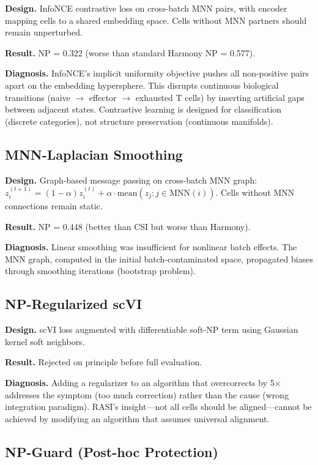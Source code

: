 \documentclass[10pt]{article}
\begin{document}
\textbf{Design.} InfoNCE contrastive loss on cross-batch MNN pairs, with encoder mapping cells to a shared embedding space. Cells without MNN partners should remain unperturbed.

\textbf{Result.} NP = 0.322 (worse than standard Harmony NP = 0.577).

\textbf{Diagnosis.} InfoNCE's implicit uniformity objective pushes all non-positive pairs apart on the embedding hypersphere. This disrupts continuous biological transitions (naive $\to$ effector $\to$ exhausted T cells) by inserting artificial gaps between adjacent states. Contrastive learning is designed for classification (discrete categories), not structure preservation (continuous manifolds).

\subsection{MNN-Laplacian Smoothing}

\textbf{Design.} Graph-based message passing on cross-batch MNN graph: $z_i^{(t+1)} = (1-\alpha)z_i^{(t)} + \alpha \cdot \text{mean}(z_j : j \in \text{MNN}(i))$. Cells without MNN connections remain static.

\textbf{Result.} NP = 0.448 (better than CSI but worse than Harmony).

\textbf{Diagnosis.} Linear smoothing was insufficient for nonlinear batch effects. The MNN graph, computed in the initial batch-contaminated space, propagated biases through smoothing iterations (bootstrap problem).

\subsection{NP-Regularized scVI}

\textbf{Design.} scVI loss augmented with differentiable soft-NP term using Gaussian kernel soft neighbors.

\textbf{Result.} Rejected on principle before full evaluation.

\textbf{Diagnosis.} Adding a regularizer to an algorithm that overcorrects by 5$\times$ addresses the symptom (too much correction) rather than the cause (wrong integration paradigm). RASI's insight---not all cells should be aligned---cannot be achieved by modifying an algorithm that assumes universal alignment.

\subsection{NP-Guard (Post-hoc Protection)}
\end{document}
